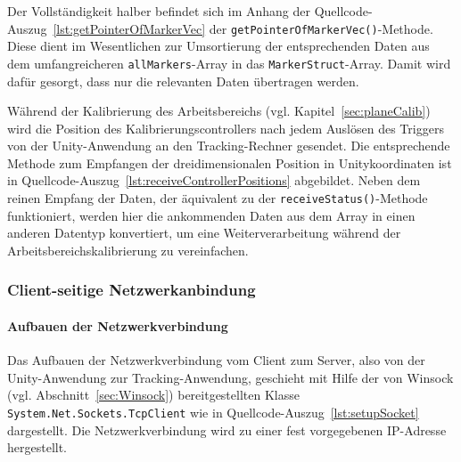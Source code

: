  

Der Vollständigkeit halber befindet sich im Anhang der Quellcode-Auszug~\ref{lst:getPointerOfMarkerVec} der \texttt{getPointerOfMarkerVec()}-Methode. Diese dient im Wesentlichen zur Umsortierung der entsprechenden Daten aus dem umfangreicheren \texttt{allMarkers}-Array in das \texttt{MarkerStruct}-Array. Damit wird dafür gesorgt, dass nur die relevanten Daten übertragen werden. 

 

Während der Kalibrierung des Arbeitsbereichs (vgl. Kapitel~\ref{sec:planeCalib}) wird die Position des Kalibrierungscontrollers nach jedem Auslösen des Triggers von der Unity-Anwendung an den Tracking-Rechner gesendet. Die entsprechende Methode zum Empfangen der dreidimensionalen Position in Unitykoordinaten ist in Quellcode-Auszug~\ref{lst:receiveControllerPositions} abgebildet. Neben dem reinen Empfang der Daten, der äquivalent zu der \texttt{receiveStatus()}-Methode funktioniert, werden hier die ankommenden Daten aus dem Array in einen anderen Datentyp konvertiert, um eine Weiterverarbeitung während der Arbeitsbereichskalibrierung zu vereinfachen. 






\subsubsection{Client-seitige Netzwerkanbindung}
\paragraph{Aufbauen der Netzwerkverbindung}
Das Aufbauen der Netzwerkverbindung vom Client zum Server, also von der Unity-Anwendung zur Tracking-Anwendung, geschieht mit Hilfe der von Winsock (vgl. Abschnitt~\ref{sec:Winsock}) bereitgestellten Klasse \texttt{System.Net.Sockets.TcpClient} wie in Quellcode-Auszug~\ref{lst:setupSocket} dargestellt. Die Netzwerkverbindung wird zu einer fest vorgegebenen IP-Adresse hergestellt.

